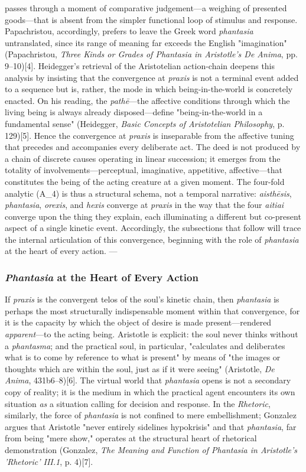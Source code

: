 \documentclass{article}
\begin{document}
passes through a moment of comparative judgement---a weighing of presented goods---that is absent from the simpler functional loop of stimulus and response. Papachristou, accordingly, prefers to leave the Greek word \textit{phantasia} untranslated, since its range of meaning far exceeds the English "imagination" (Papachristou, \textit{Three Kinds or Grades of Phantasia in Aristotle's De Anima}, pp. 9--10)[4]. Heidegger's retrieval of the Aristotelian action-chain deepens this analysis by insisting that the convergence at \textit{praxis} is not a terminal event added to a sequence but is, rather, the mode in which being-in-the-world is concretely enacted. On his reading, the \textit{pathē}---the affective conditions through which the living being is always already disposed---define "being-in-the-world in a fundamental sense" (Heidegger, \textit{Basic Concepts of Aristotelian Philosophy}, p. 129)[5]. Hence the convergence at \textit{praxis} is inseparable from the affective tuning that precedes and accompanies every deliberate act. The deed is not produced by a chain of discrete causes operating in linear succession; it emerges from the totality of involvements---perceptual, imaginative, appetitive, affective---that constitutes the being of the acting creature at a given moment. The four-fold analytic (A\_4) is thus a structural schema, not a temporal narrative: \textit{aisthēsis}, \textit{phantasia}, \textit{orexis}, and \textit{hexis} converge at \textit{praxis} in the way that the four \textit{aitiai} converge upon the thing they explain, each illuminating a different but co-present aspect of a single kinetic event. Accordingly, the subsections that follow will trace the internal articulation of this convergence, beginning with the role of \textit{phantasia} at the heart of every action. --- \subsubsection*{\textit{Phantasia} at the Heart of Every Action} If \textit{praxis} is the convergent telos of the soul's kinetic chain, then \textit{phantasia} is perhaps the most structurally indispensable moment within that convergence, for it is the capacity by which the object of desire is made present---rendered \textit{apparent}---to the acting being. Aristotle is explicit: the soul never thinks without a \textit{phantasma}; and the practical soul, in particular, "calculates and deliberates what is to come by reference to what is present" by means of "the images or thoughts which are within the soul, just as if it were seeing" (Aristotle, \textit{De Anima}, 431b6--8)[6]. The virtual world that \textit{phantasia} opens is not a secondary copy of reality; it is the medium in which the practical agent encounters its own situation \textit{as} a situation calling for decision and response. In the \textit{Rhetoric}, similarly, the force of \textit{phantasia} is not confined to mere embellishment; Gonzalez argues that Aristotle "never entirely sidelines hypokrisis" and that \textit{phantasia}, far from being "mere show," operates at the structural heart of rhetorical demonstration (Gonzalez, \textit{The Meaning and Function of Phantasia in Aristotle's 'Rhetoric' III.1}, p. 4)[7]. 
\end{document}
